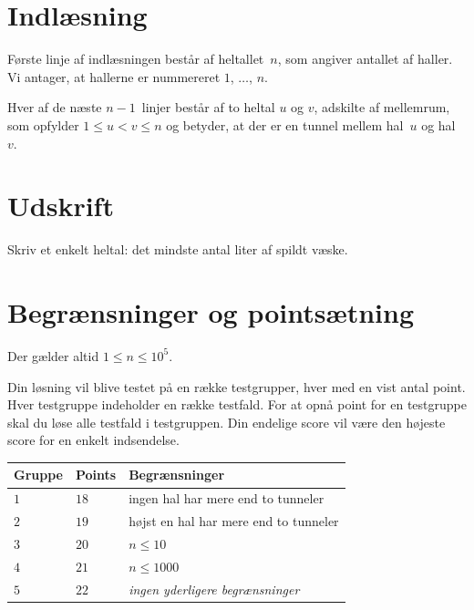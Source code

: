 \section*{Indlæsning}

Første linje af indlæsningen består af heltallet~$n$, som angiver antallet af haller.
Vi antager, at hallerne er nummereret $1$, $\ldots$, $n$.

Hver af de næste $n-1$~linjer består af to heltal $u$ og $v$, adskilte af mellemrum, som opfylder
$1\leq u < v \leq n$ %
og betyder, at der er en tunnel mellem hal~$u$ og hal~$v$.

\section*{Udskrift}

Skriv et enkelt heltal: det mindste antal liter af spildt væske.

\section*{Begrænsninger og pointsætning}

Der gælder altid
$1\leq n\leq 10^5$. %

Din løsning vil blive testet på en række testgrupper, hver med en vist antal point.
Hver testgruppe indeholder en række testfald.
For at opnå point for en testgruppe skal du løse alle testfald i testgruppen.
Din endelige score vil være den højeste score for en enkelt indsendelse.

\medskip
\begin{tabular}{lll}
  Gruppe & Points & Begrænsninger \\\hline
  $1$ & $18$ & ingen hal har mere end to tunneler\\
  $2$ & $19$ & højst en hal har mere end to tunneler\\
  $3$ & $20$ & $n\leq 10$\\
  $4$ & $21$ & $n\leq 1000$\\
  $5$ & $22$ & \emph{ingen yderligere begrænsninger}
\end{tabular}
